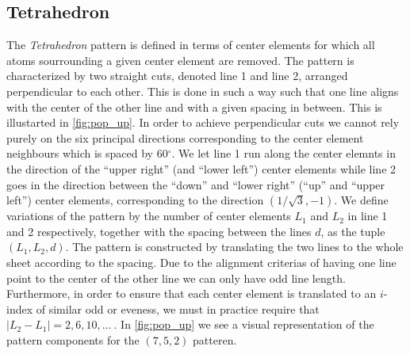 \subsection{Tetrahedron}
The \textit{Tetrahedron} pattern is defined in terms of center elements for
which all atoms sourrounding a given center element are removed. The pattern is
characterized by two straight cuts, denoted line 1 and line 2, arranged
perpendicular to each other. This is done in such a way such that one line aligns with the center of the
other line and with a given spacing in between. This is illustarted in \cref{fig:pop_up}. In order to achieve
perpendicular cuts we cannot rely purely on the six principal directions
corresponding to the center element neighbours which is spaced by 60$^\circ$.
We let line 1 run along the center elemnts in the direction of the
``upper right'' (and ``lower left'') center elements  while line 2 goes in the
direction between the ``down'' and ``lower right'' (``up'' and ``upper left'') center elements, corresponding to the direction $(1/\sqrt{3}, -1)$. We define variations of the pattern by the number of center elements $L_1$ and $L_2$ in line 1 and 2 respectively, together with the spacing between the lines $d$, as the tuple $(L_1, L_2, d)$. The pattern is constructed by translating the two lines to the whole sheet according to the spacing. Due to the alignment criterias of having one line point to the center of the other line we can only have odd line length. Furthermore, in order to ensure that each center element is translated to an $i$-index of similar odd or eveness, we must in practice require that $|L_2 - L_1| = 2, 6, 10, \ldots \ $. In \cref{fig:pop_up} we see a visual representation of the pattern components for the $(7, 5, 2)$ patteren. 


